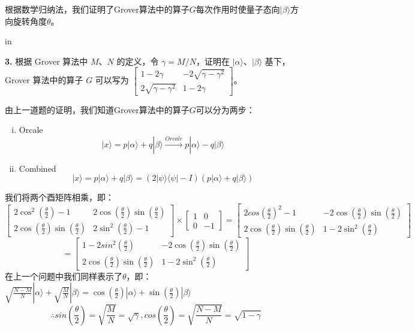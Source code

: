 \documentclass[11pt]{article}
\begin{document}
根据数学归纳法，我们证明了Grover算法中的算子$G$每次作用时使量子态向$|\beta\rangle$方向旋转角度$\theta$。

 in

{\bf 3.} 根据 Grover 算法中 $M$、$N$ 的定义，令 $\gamma = M/N$，证明在 $|\alpha\rangle$、$|\beta\rangle$ 基下，Grover 算法中的算子 $G$ 可以写为 $\begin{bmatrix}
    1-2\gamma & -2\sqrt{\gamma-\gamma^2} \\ 2\sqrt{\gamma-\gamma^2} & 1-2\gamma
\end{bmatrix}$。

由上一道题的证明，我们知道Grover算法中的算子$G$可以分为两步：
\begin{enumerate}[i.]
    \item Orcale
    \[|x\rangle = p |\alpha\rangle + q |\beta\rangle \stackrel{Orcale}\longrightarrow  p |\alpha\rangle - q|\beta\rangle\]
    \item Combined
    \[|x\rangle = p |\alpha\rangle + q |\beta\rangle =  \left(2|\psi\rangle\langle\psi| - I\right) \left(p |\alpha\rangle + q |\beta\rangle \right)\]
\end{enumerate}
我们将两个酉矩阵相乘，即：
\[
\begin{bmatrix}
    2\cos^2(\frac{\theta}{2}) - 1 & 2\cos(\frac{\theta}{2})\sin(\frac{\theta}{2}) \\
    2\cos(\frac{\theta}{2})\sin(\frac{\theta}{2}) & 2\sin^2(\frac{\theta}{2}) - 1
\end{bmatrix}
\times
\begin{bmatrix}
    1 & 0\\
    0 & -1
\end{bmatrix}
=
\begin{bmatrix}
    2cos(\frac{\theta}{2})^2 - 1 & -2\cos(\frac{\theta}{2})\sin(\frac{\theta}{2}) \\
    2\cos(\frac{\theta}{2})\sin(\frac{\theta}{2}) & 1-2\sin^2(\frac{\theta}{2})
\end{bmatrix}
\]
\[
= 
\begin{bmatrix}
    1-2sin^2(\frac{\theta}{2}) & -2\cos(\frac{\theta}{2})\sin(\frac{\theta}{2}) \\
    2\cos(\frac{\theta}{2})\sin(\frac{\theta}{2}) & 1-2\sin^2(\frac{\theta}{2})
\end{bmatrix}
\]
在上一个问题中我们同样表示了$\theta$，即：
$\sqrt{\frac{N-M}{N}}|\alpha\rangle + \sqrt{\frac{M}{N}} |\beta\rangle= \cos(\frac{\theta}{2}) |\alpha\rangle + \sin(\frac{\theta}{2}) |\beta\rangle$
\[\therefore sin(\frac{\theta}{2}) = \sqrt{\frac{M}{N}} = \sqrt{\gamma},cos(\frac{\theta}{2}) = \sqrt{\frac{N-M}{N}} = \sqrt{1-\gamma} \]
\end{document}
